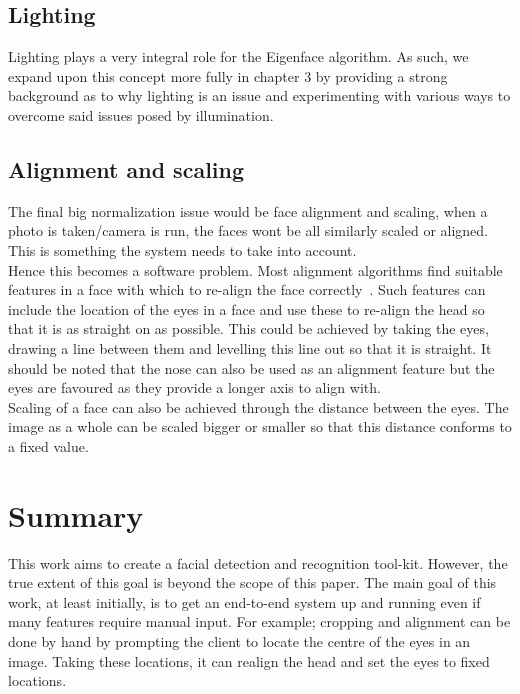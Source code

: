 		\subsection{Lighting}
		Lighting plays a very integral role for the Eigenface algorithm.  As such, we expand upon this concept
		more fully in chapter 3 by providing a strong background as to why lighting is an issue and experimenting 
		with various ways to overcome said issues posed by illumination. 
		
		\subsection{Alignment and scaling}
		The final big normalization issue would be face alignment and scaling, when a photo is taken/camera is 
		run, the faces wont be all similarly scaled or aligned.  This is something the system needs to take
		into account. \\
		
		Hence this becomes a software problem.  Most alignment algorithms find suitable features in a face with 
		which to re-align the face correctly~\cite{hasan2011improving}.  Such features can include the location 
		of the eyes in a face and use these to re-align the head so that it is as straight on as possible.  This 
		could be achieved by taking the eyes, drawing a line between them and levelling this line out so that it 
		is straight.  It should be noted that the nose can also be used as an alignment feature but the eyes are 
		favoured as they provide a longer axis to align with.  \\
		
		Scaling of a face can also be achieved through the distance between the eyes.  The image as a whole 
		can be scaled bigger or smaller so that this distance conforms to a fixed value. 	
		
\section{Summary}
	This work aims to create a facial detection and recognition tool-kit.  However, the true extent of this goal 
	is beyond the scope of this paper.  The main goal of this work, at least initially, is to get an end-to-end 
	system up and running even if many features require manual input.  For example; cropping and alignment can be 
	done by hand by prompting the client to locate the centre of the eyes in an image.  Taking these locations, it
	can realign the head and set the eyes to fixed locations. \\
	

